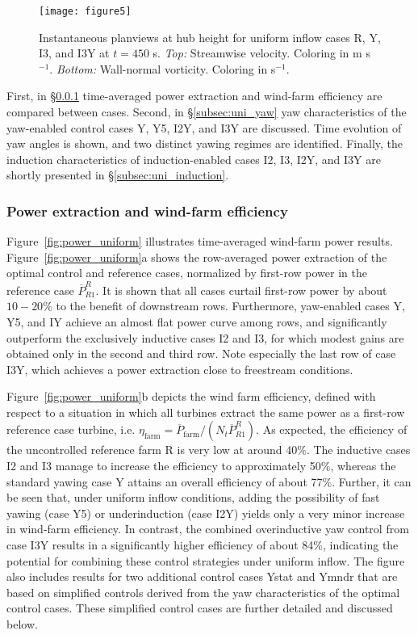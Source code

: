 \documentclass[energies,article,submit,moreauthors,latex,10pt,a4paper]{mdpi}
\begin{document}
\begin{figure}
	\texttt{[image: figure5]}
	\caption{Instantaneous planviews at hub height for uniform inflow cases R, Y, I3, and I3Y at $t= 450$ s. \emph{Top: } Streamwise velocity. Coloring in m s$^{-1}$. \emph{Bottom: } Wall-normal vorticity. Coloring in s$^{-1}$. \label{fig:flowfield_uniform}}
\end{figure}

First, in \S\ref{subsec:uni_powerextr} time-averaged power extraction and wind-farm efficiency are compared between cases. Second, in \S\ref{subsec:uni_yaw} yaw characteristics of the yaw-enabled control cases Y, Y5, I2Y, and I3Y are discussed. Time evolution of yaw angles is shown, and two distinct yawing regimes are identified. Finally, the induction characteristics of induction-enabled cases I2, I3, I2Y, and I3Y are shortly presented in \S\ref{subsec:uni_induction}.

\subsubsection{Power extraction and wind-farm efficiency}\label{subsec:uni_powerextr}
\noindent Figure~\ref{fig:power_uniform} illustrates time-averaged wind-farm power results. Figure~\ref{fig:power_uniform}a shows the row-averaged power extraction of the optimal control and reference cases, normalized by first-row power in the reference case $\overline{P}_{R1}^R$. It is shown that all cases curtail first-row power by about $10-20\%$ to the benefit of downstream rows. Furthermore, yaw-enabled cases Y, Y5, and IY achieve an almost flat power curve among rows, and significantly outperform the exclusively inductive cases I2 and I3, for which modest gains are obtained only in the second and third row. Note especially the last row of case I3Y, which achieves a power extraction close to freestream conditions.

Figure~\ref{fig:power_uniform}b depicts the wind farm efficiency, defined with respect to a situation in which all turbines extract the same power as a first-row reference case turbine, i.e. $\eta_{\text{farm}} = \overline{P}_{\text{farm}}/(N_t \overline{P}_{R1}^{R})$. As expected, the efficiency of the uncontrolled reference farm R is very low at around $40\%$. The inductive cases I2 and I3 manage to increase the efficiency to approximately 50\%, whereas the standard yawing case Y attains an overall efficiency of about 77$\%$. Further, it can be seen that, under uniform inflow conditions, adding the possibility of fast yawing (case Y5) or underinduction (case I2Y) yields only a very minor increase in wind-farm efficiency. In contrast, the combined overinductive yaw control from case I3Y results in a significantly higher efficiency of about 84\%, indicating the potential for combining these control strategies under uniform inflow. The figure also includes results for two additional control cases Ystat and Ymndr that are based on simplified controls derived from the yaw characteristics of the optimal control cases. These simplified control cases are further detailed and discussed below.
\end{document}
